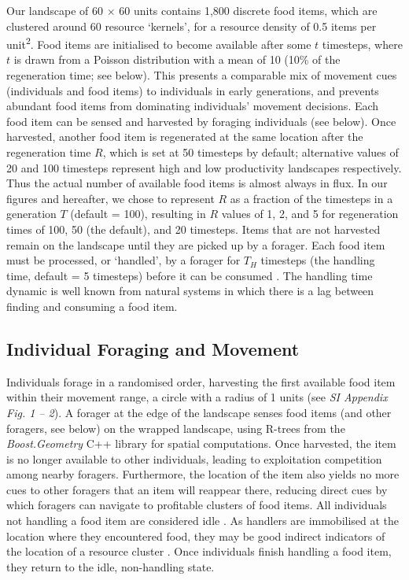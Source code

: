 Our landscape of 60 $\times$ 60 units contains 1,800 discrete food items, which are clustered around 60 resource `kernels', for a resource density of 0.5 items per unit\textsuperscript{2}.
Food items are initialised to become available after some $t$ timesteps, where $t$ is drawn from a Poisson distribution with a mean of 10 (10\% of the regeneration time; see below).
This presents a comparable mix of movement cues (individuals and food items) to individuals in early generations, and prevents abundant food items from dominating individuals' movement decisions.
Each food item can be sensed and harvested by foraging individuals (see below).
Once harvested, another food item is regenerated at the same location after the regeneration time $R$, which is set at 50 timesteps by default; alternative values of 20 and 100 timesteps represent high and low productivity landscapes respectively.
Thus the actual number of available food items is almost always in flux.
In our figures and hereafter, we chose to represent $R$ as a fraction of the timesteps in a generation $T$ (default = 100), resulting in $R$ values of 1, 2, and 5 for regeneration times of 100, 50 (the default), and 20 timesteps.
Items that are not harvested remain on the landscape until they are picked up by a forager.
Each food item must be processed, or `handled', by a forager for $T_H$ timesteps (the handling time, default = 5 timesteps) before it can be consumed \citep{ruxton1992,gupte2021a}.
The handling time dynamic is well known from natural systems in which there is a lag between finding and consuming a food item.

\subsection*{Individual Foraging and Movement}

Individuals forage in a randomised order, harvesting the first available food item within their movement range, a circle with a radius of 1 units (see \textit{SI Appendix Fig. 1 -- 2}).
A forager at the edge of the landscape senses food items (and other foragers, see below) on the wrapped landscape, using R-trees from the \textit{Boost.Geometry} C++ library for spatial computations.
Once harvested, the item is no longer available to other individuals, leading to exploitation competition among nearby foragers.
Furthermore, the location of the item also yields no more cues to other foragers that an item will reappear there, reducing direct cues by which foragers can navigate to profitable clusters of food items.
All individuals not handling a food item are considered idle \citep{ruxton1992,gupte2021a}.
As handlers are immobilised at the location where they encountered food, they may be good indirect indicators of the location of a resource cluster \cite[`social information'][]{danchin2004,romano2020,gupte2021a}.
Once individuals finish handling a food item, they return to the idle, non-handling state.

